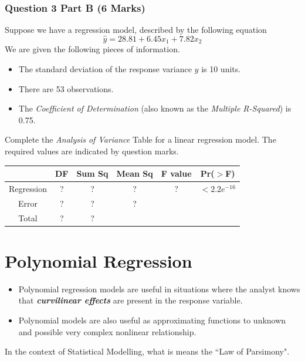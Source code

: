 \documentclass[a4paper,12pt]{article}
\begin{document}
\subsubsection*{Question 3 Part B (6 Marks)}
Suppose we have a regression model, described by the following equation
\[ \hat{y} = 28.81 + 6.45x_1 + 7.82 x_2\]
We are given the following pieces of information.
\begin{itemize}
	\item The standard deviation of the response variance $y$ is 10 units.
	\item There are 53 observations.
	\item The \textit{Coefficient of Determination} (also known as the \textit{Multiple R-Squared}) is 0.75.
\end{itemize}
Complete the \textit{Analysis of Variance} Table for a linear regression model.
The required values are indicated by question marks.

\begin{center}
	\begin{tabular}{|c|c|c|c|c|c|} \hline
		\phantom{makespace}	& DF & 	Sum Sq &	Mean Sq &	F value &   	Pr($>$F)    \\ \hline
		Regression &  \phantom{make}?\phantom{make} &	? &	? &	 ? &	$< 2.2e^{-16}$ \\ \hline
		Error  & ? &	? &  	?   &            &       \\ \hline
		Total  & ?  &	? &  \phantom{makespace}	  &   \phantom{makespace}         &    \phantom{makespace}    \\ \hline
	\end{tabular} 
\end{center}


\newpage


\section*{Polynomial Regression}
\begin{itemize}
	\item Polynomial regression models are useful in situations where the analyst knows that \textit{\textbf{curvilinear effects}} are present in the response variable.
	\item Polynomial models are also useful as approximating functions to unknown and possible very complex nonlinear relationship.
\end{itemize}


In the context of Statistical Modelling, what is means the ``Law of Parsimony".
\end{document}
